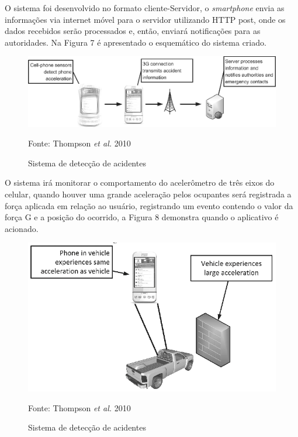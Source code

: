 O sistema foi desenvolvido no formato cliente-Servidor, o \textit{smartphone} envia as informações via internet móvel para o servidor utilizando HTTP post, onde os dados recebidos serão processados e, então, enviará notificações para as autoridades. Na Figura 7 é apresentado o esquemático do sistema criado.

 \begin{figure}[H]

 \caption{Sistema de detecção de acidentes}
  \includegraphics[width=150mm]{images/Cap2/esquema.png}
  
  \scriptsize Fonte: Thompson \textit{et al.} 2010
  
    
\end{figure}



O sistema irá monitorar o comportamento do acelerômetro de três eixos do celular, quando houver uma grande aceleração pelos ocupantes será registrada a força aplicada em relação ao usuário, registrando um evento contendo o valor da força G e a posição do ocorrido, a Figura 8 demonstra quando o aplicativo é acionado.



 \begin{figure}[H]

 \caption{Sistema de detecção de acidentes}
  \includegraphics[width=150mm]{images/Cap2/acionamento.png}
  
    \scriptsize Fonte: Thompson \textit{et al.} 2010
\end{figure}



